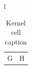 \documentclass{article}
\begin{document}
\begin{table}
\begin{tabular}{l}
\begin{minipage}{\linewidth}\caption{Kernel cell caption}\begin{tabular}{ll} G & H \\ \end{tabular}\end{minipage} \\
\end{tabular}
\end{table}
\end{document}
